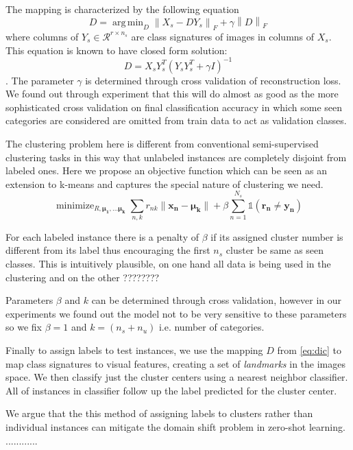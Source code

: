\documentclass[wcp]{jmlr}
\newcommand{\norm}[1]{\left \lVert #1 \right \rVert_{F}}
\DeclareMathOperator*{\argmin}{arg\,min}
\DeclareMathOperator*{\minimize}{minimize}
\begin{document}
The mapping is characterized by the following equation
\begin{equation}
  D = \argmin_D \norm{X_s - D Y_s} + \gamma \norm{D}
\end{equation}
where columns of $ Y_s \in \mathcal{R}^{r \times n_s} $  are class signatures of images in columns of $X_s$.
This equation is known to have closed form solution:
\begin{equation} \label{eq:dic}
  D = X_s Y_s^T (Y_s Y_s^T + \gamma I)^{-1}
\end{equation}.
The parameter $\gamma$ is determined through cross validation of reconstruction loss. We found out through experiment that
this will do almost as good as the more sophisticated
 cross validation on final classification accuracy in which some seen categories are considered are omitted
 from train data to act as validation classes.

The clustering problem here is different from conventional semi-supervised clustering tasks \cite{}
in this way that unlabeled instances are completely disjoint from labeled ones. Here we propose an objective function which
can be seen as an extension to k-means and captures the special nature of clustering we need.
\begin{equation}
\minimize_{R, \mathbf{\mu_1, \ldots \mu_k }}  \sum_{n,k} r_{nk} \lVert \mathbf{x_n - \mu_k} \rVert +
 \beta \sum_{n=1}^{N_s} \mathds{1}(\mathbf{r_n \neq y_n})
\end{equation}

For each labeled instance there is a penalty of $\beta$ if its assigned cluster number is different from its label thus encouraging
the first $n_s$ cluster be same as seen classes. This is intuitively plausible, on one hand all data is being used
in the clustering and on the other ????????

Parameters $\beta$ and $k$ can be determined through cross validation, however in our experiments we found out
the model not to be very sensitive to these parameters so we fix $\beta=1$ and $k =  (n_s + n_u)$ i.e. number of categories.

Finally to assign labels to test instances, we use the mapping $D$ from \eqref{eq:dic} to map class signatures to visual
features, creating a set of \textit{landmarks} in the images space. We then classify just the cluster centers using a
nearest neighbor classifier. All of instances in classifier follow up the label predicted for the cluster center.

We argue that the this method of assigning labels to clusters rather than individual instances can mitigate the
domain shift problem in zero-shot learning.
............
\end{document}

